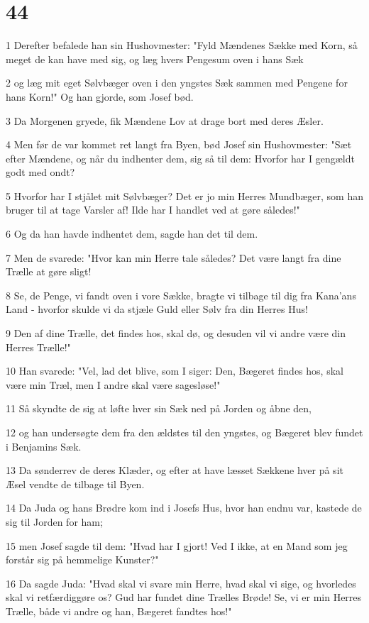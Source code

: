 \chapter{44}

\par 1 Derefter befalede han sin Hushovmester: "Fyld Mændenes Sække med Korn, så meget de kan have med sig, og læg hvers Pengesum oven i hans Sæk
\par 2 og læg mit eget Sølvbæger oven i den yngstes Sæk sammen med Pengene for hans Korn!" Og han gjorde, som Josef bød.
\par 3 Da Morgenen gryede, fik Mændene Lov at drage bort med deres Æsler.
\par 4 Men før de var kommet ret langt fra Byen, bød Josef sin Hushovmester: "Sæt efter Mændene, og når du indhenter dem, sig så til dem: Hvorfor har I gengældt godt med ondt?
\par 5 Hvorfor har I stjålet mit Sølvbæger? Det er jo min Herres Mundbæger, som han bruger til at tage Varsler af! Ilde har I handlet ved at gøre således!"
\par 6 Og da han havde indhentet dem, sagde han det til dem.
\par 7 Men de svarede: "Hvor kan min Herre tale således? Det være langt fra dine Trælle at gøre sligt!
\par 8 Se, de Penge, vi fandt oven i vore Sække, bragte vi tilbage til dig fra Kana'ans Land - hvorfor skulde vi da stjæle Guld eller Sølv fra din Herres Hus!
\par 9 Den af dine Trælle, det findes hos, skal dø, og desuden vil vi andre være din Herres Trælle!"
\par 10 Han svarede: "Vel, lad det blive, som I siger: Den, Bægeret findes hos, skal være min Træl, men I andre skal være sagesløse!"
\par 11 Så skyndte de sig at løfte hver sin Sæk ned på Jorden og åbne den,
\par 12 og han undersøgte dem fra den ældstes til den yngstes, og Bægeret blev fundet i Benjamins Sæk.
\par 13 Da sønderrev de deres Klæder, og efter at have læsset Sækkene hver på sit Æsel vendte de tilbage til Byen.
\par 14 Da Juda og hans Brødre kom ind i Josefs Hus, hvor han endnu var, kastede de sig til Jorden for ham;
\par 15 men Josef sagde til dem: "Hvad har I gjort! Ved I ikke, at en Mand som jeg forstår sig på hemmelige Kunster?"
\par 16 Da sagde Juda: "Hvad skal vi svare min Herre, hvad skal vi sige, og hvorledes skal vi retfærdiggøre os? Gud har fundet dine Trælles Brøde! Se, vi er min Herres Trælle, både vi andre og han, Bægeret fandtes hos!"

